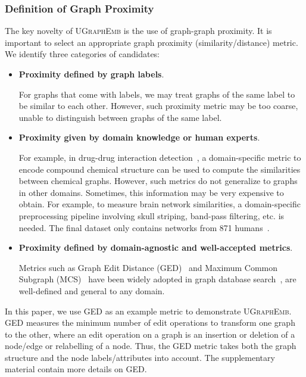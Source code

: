 \documentclass{article}
\newcommand{\model}{\textsc{UGraphEmb}\xspace}
\begin{document}
\subsubsection{Definition of Graph Proximity}
The key novelty of \model is the use of graph-graph proximity. It is important to select an appropriate graph proximity (similarity/distance) metric. We identify three categories of candidates:
\begin{itemize}
    \item \textbf{{Proximity defined by graph labels}}.
    
    For graphs that come with labels, we may treat graphs of the same label to be similar to each other. 
    However, such proximity metric may be too coarse, unable to distinguish between graphs of the same label. 


    \item \textbf{{Proximity given by domain knowledge or human experts}}.
    
    For example, in drug-drug interaction detection~\cite{ma2018drug}, a domain-specific metric to encode compound chemical structure can be used to compute the similarities between chemical graphs. 
    However, such metrics do not generalize to graphs in other domains. Sometimes, this information may be very expensive to obtain. For example, to measure brain network similarities, a domain-specific preprocessing pipeline involving skull striping, band-pass filtering, etc. is needed. The final dataset only contains networks from 871 humans~\cite{ktena2017distance}.

    \item \textbf{{Proximity defined by domain-agnostic and well-accepted metrics}}.
    
    Metrics such as Graph Edit Distance (GED)~\cite{bunke1983distance} and Maximum Common Subgraph (MCS)~\cite{bunke1998graph} have been widely adopted in graph database search~\cite{yan2005substructure,liang2017similarity}, are well-defined and general to any domain. 
\end{itemize}

In this paper, we use GED as an example metric to demonstrate \model. 
GED measures the minimum number of edit operations to transform one graph to the other, where an edit operation on a graph is an insertion or deletion of a node/edge or relabelling of a node. Thus, the GED metric takes both the graph structure and the node labels/attributes into account. The supplementary material contain more details on GED. 
\end{document}
